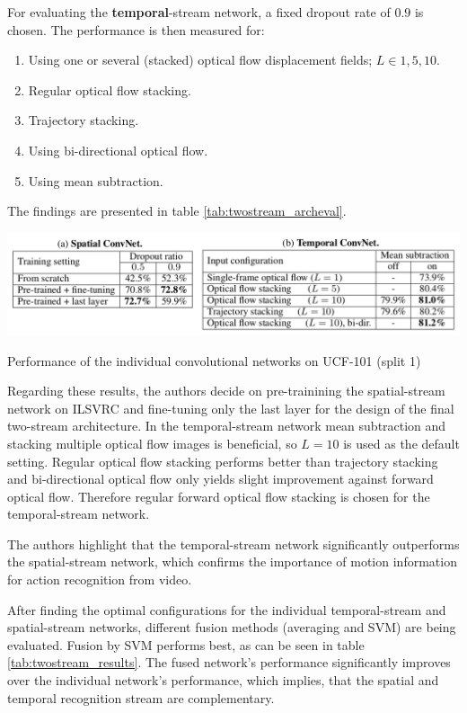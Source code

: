 For evaluating the \textbf{temporal}-stream network, a fixed dropout rate of $0.9$ is chosen.
The performance is then measured for:
\begin{enumerate}
    \item Using one or several (stacked) optical flow displacement fields; $L \in {1,5,10}$.
    \item Regular optical flow stacking.
    \item Trajectory stacking.
    \item Using bi-directional optical flow.
    \item Using mean subtraction.
\end{enumerate}

The findings are presented in table \ref{tab:twostream_archeval}.
\begin{table}[H]
    \centering
    \includegraphics[width=\textwidth]{img_deep/twostream_archeval}
    \caption{Performance of the individual convolutional networks on UCF-101 (split 1) \cite{simonyan_two-stream_2014}}
    \label{tab:twostream_archeval}
\end{table}

Regarding these results, the authors decide on pre-trainining the spatial-stream network on ILSVRC and fine-tuning only the last layer for the design of the final two-stream architecture.
In the temporal-stream network mean subtraction and stacking multiple optical flow images is beneficial, so $L=10$ is used as the default setting.
Regular optical flow stacking performs better than trajectory stacking and bi-directional optical flow only yields slight improvement against forward optical flow.
Therefore regular forward optical flow stacking is chosen for the temporal-stream network.

The authors highlight that the temporal-stream network significantly outperforms the spatial-stream network, which confirms the importance of motion information for action recognition from video.

After finding the optimal configurations for the individual temporal-stream and spatial-stream networks, different fusion methods (averaging and SVM) are being evaluated.
Fusion by SVM performs best, as can be seen in table \ref{tab:twostream_results}.
The fused network's performance significantly improves over the individual network's performance, which implies, that the spatial and temporal recognition stream are complementary.


